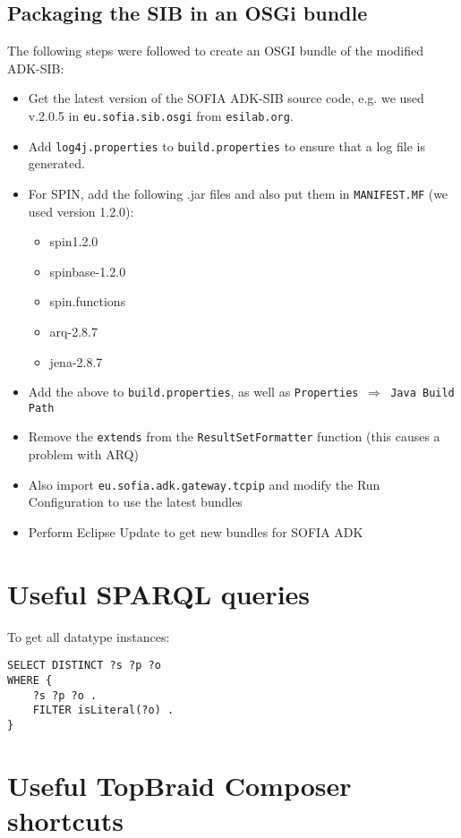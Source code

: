 \subsection{Packaging the SIB in an OSGi bundle}
The following steps were followed to create an OSGI bundle of the modified ADK-SIB:

\begin{itemize}
	\item Get the latest version of the SOFIA ADK-SIB source code, e.g. we used v.2.0.5 in \texttt{eu.sofia.sib.osgi} from \texttt{esilab.org}.
	\item Add \texttt{log4j.properties} to \texttt{build.properties} to ensure that a log file is generated.
	\item For SPIN, add the following .jar files and also put them in \texttt{MANIFEST.MF} (we used version 1.2.0):
	\begin{itemize}
		\item spin1.2.0
		\item spinbase-1.2.0
		\item spin.functions
		\item arq-2.8.7
		\item jena-2.8.7
	\end{itemize}
	\item Add the above to \texttt{build.properties}, as well as \texttt{Properties}~$\Rightarrow$~\texttt{Java Build Path}
	\item Remove the \texttt{extends} from the \texttt{ResultSetFormatter} function (this causes a problem with ARQ)
	\item Also import \texttt{eu.sofia.adk.gateway.tcpip} and modify the Run Configuration to use the latest bundles
	\item Perform Eclipse Update to get new bundles for SOFIA ADK
	
\end{itemize}


\section{Useful SPARQL queries}
To get all datatype instances: %
\begin{verbatim}
SELECT DISTINCT ?s ?p ?o
WHERE {
	?s ?p ?o .
	FILTER isLiteral(?o) .
}
\end{verbatim}



\section{Useful TopBraid Composer shortcuts}

